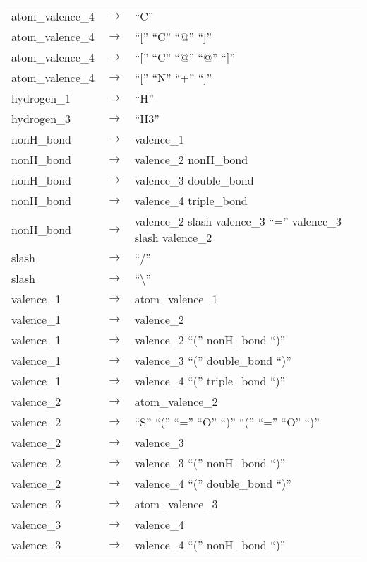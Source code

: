 \documentclass[../Document.tex]{subfiles}
\begin{document}
\begin{longtable}{m{} p{} p{}}
    atom\_valence\_4 & $\rightarrow$ & ``C'' \\
    atom\_valence\_4 & $\rightarrow$ & ``['' ``C'' ``@'' ``]'' \\
    atom\_valence\_4 & $\rightarrow$ & ``['' ``C'' ``@'' ``@'' ``]'' \\
    atom\_valence\_4 & $\rightarrow$ & ``['' ``N'' ``+'' ``]'' \\
    hydrogen\_1 & $\rightarrow$ & ``H'' \\
    hydrogen\_3 & $\rightarrow$ & ``H3'' \\
    nonH\_bond & $\rightarrow$ & valence\_1 \\
    nonH\_bond & $\rightarrow$ & valence\_2 nonH\_bond \\
    nonH\_bond & $\rightarrow$ & valence\_3 double\_bond \\
    nonH\_bond & $\rightarrow$ & valence\_4 triple\_bond \\
    nonH\_bond & $\rightarrow$ & valence\_2 slash valence\_3 ``='' valence\_3 slash valence\_2 \\
    slash & $\rightarrow$ & ``/'' \\
    slash & $\rightarrow$ & ``\textbackslash'' \\
    valence\_1 & $\rightarrow$ & atom\_valence\_1 \\
    valence\_1 & $\rightarrow$ & valence\_2 \\
    valence\_1 & $\rightarrow$ & valence\_2 ``('' nonH\_bond ``)'' \\
    valence\_1 & $\rightarrow$ & valence\_3 ``('' double\_bond ``)'' \\
    valence\_1 & $\rightarrow$ & valence\_4 ``('' triple\_bond ``)'' \\
    valence\_2 & $\rightarrow$ & atom\_valence\_2 \\
    valence\_2 & $\rightarrow$ & ``S'' ``('' ``='' ``O'' ``)'' ``('' ``='' ``O'' ``)'' \\
    valence\_2 & $\rightarrow$ & valence\_3 \\
    valence\_2 & $\rightarrow$ & valence\_3 ``('' nonH\_bond ``)'' \\
    valence\_2 & $\rightarrow$ & valence\_4 ``('' double\_bond ``)'' \\
    valence\_3 & $\rightarrow$ & atom\_valence\_3 \\
    valence\_3 & $\rightarrow$ & valence\_4 \\
    valence\_3 & $\rightarrow$ & valence\_4 ``('' nonH\_bond ``)'' \\

\end{longtable}
\end{document}
